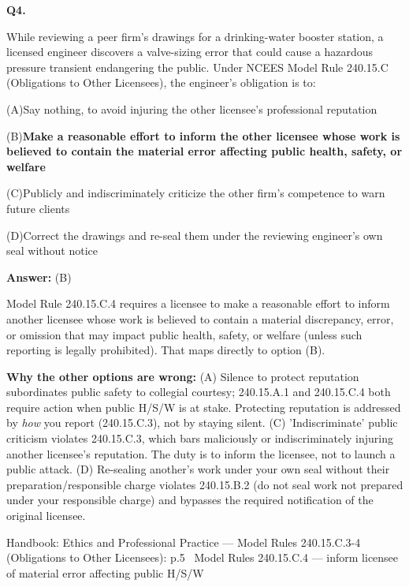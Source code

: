 \documentclass[11pt]{article}
\newcommand{\correct}[1]{\textbf{#1}\;{\color{accent}$\checkmark$}}
\newcommand{\optline}[2]{\par\noindent\hspace{1.2em}(#1)\hspace{0.6em}#2}
\begin{document}
\vspace{9pt}
\filbreak
\textbf{\color{accent}Q4.}\par\vspace{2pt}
While reviewing a peer firm's drawings for a drinking-water booster station, a licensed engineer discovers a valve-sizing error that could cause a hazardous pressure transient endangering the public. Under NCEES Model Rule 240.15.C (Obligations to Other Licensees), the engineer's obligation is to:\par\par\vspace{3pt}
\optline{A}{Say nothing, to avoid injuring the other licensee's professional reputation}
\optline{B}{\correct{Make a reasonable effort to inform the other licensee whose work is believed to contain the material error affecting public health, safety, or welfare}}
\optline{C}{Publicly and indiscriminately criticize the other firm's competence to warn future clients}
\optline{D}{Correct the drawings and re-seal them under the reviewing engineer's own seal without notice}
\par\vspace{3pt}
\vspace{2pt}\par\noindent\colorbox{boxbg}{\parbox{\dimexpr\linewidth-2\fboxsep\relax}{%
\vspace{2pt}\textbf{Answer:} (B)\par\vspace{2pt}
{\small Model Rule 240.15.C.4 requires a licensee to make a reasonable effort to inform another licensee whose work is believed to contain a material discrepancy, error, or omission that may impact public health, safety, or welfare (unless such reporting is legally prohibited). That maps directly to option (B).\par
\textbf{Why the other options are wrong:} (A) Silence to protect reputation subordinates public safety to collegial courtesy; 240.15.A.1 and 240.15.C.4 both require action when public H/S/W is at stake. Protecting reputation is addressed by \emph{how} you report (240.15.C.3), not by staying silent. (C) 'Indiscriminate' public criticism violates 240.15.C.3, which bars maliciously or indiscriminately injuring another licensee's reputation. The duty is to inform the licensee, not to launch a public attack. (D) Re-sealing another's work under your own seal without their preparation/responsible charge violates 240.15.B.2 (do not seal work not prepared under your responsible charge) and bypasses the required notification of the original licensee.\par}\par\vspace{2pt}
{\footnotesize\color{soft}Handbook: Ethics and Professional Practice --- Model Rules 240.15.C.3-4 (Obligations to Other Licensees): p.5 \textbullet\ Model Rules 240.15.C.4 --- inform licensee of material error affecting public H/S/W}\vspace{2pt}
}}
\end{document}
